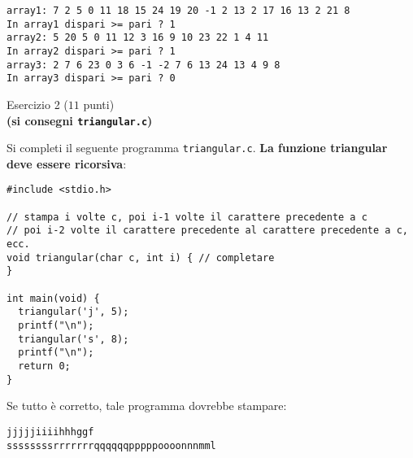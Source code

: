 \documentclass[12pt]{article}
\begin{document}
\begin{mdframed}[backgroundcolor=lightgrey] 
\begin{verbatim}
array1: 7 2 5 0 11 18 15 24 19 20 -1 2 13 2 17 16 13 2 21 8 
In array1 dispari >= pari ? 1
array2: 5 20 5 0 11 12 3 16 9 10 23 22 1 4 11 
In array2 dispari >= pari ? 1
array3: 2 7 6 23 0 3 6 -1 -2 7 6 13 24 13 4 9 8 
In array3 dispari >= pari ? 0
\end{verbatim}
\end{mdframed}

\begin{center}
  {\Large Esercizio 2} ($11$ punti)\\
  \textbf{(si consegni \texttt{triangular.c})}
\end{center}
%
Si completi il seguente programma \texttt{triangular.c}.
\textbf{La funzione triangular deve essere ricorsiva}:

\begin{center}
  \begin{lstlisting}[language=myC]
#include <stdio.h>

// stampa i volte c, poi i-1 volte il carattere precedente a c
// poi i-2 volte il carattere precedente al carattere precedente a c, ecc.
void triangular(char c, int i) { // completare
}

int main(void) {
  triangular('j', 5);
  printf("\n");
  triangular('s', 8);
  printf("\n");
  return 0;
}
  \end{lstlisting}
\end{center}

Se tutto \`e corretto, tale programma dovrebbe stampare:

\begin{mdframed}[backgroundcolor=lightgrey] 
\begin{verbatim}
jjjjjiiiihhhggf
ssssssssrrrrrrrqqqqqqpppppoooonnnmml
\end{verbatim}
\end{mdframed}
\end{document}
